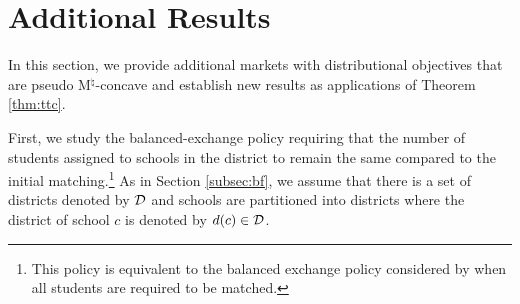 \documentclass[12pt]{amsart}
\theoremstyle{remark}
\newcommand{\ieh}[1]{{\color{orange} IEH: #1 }}
\newcommand{\fk}[1]{{\color{red} FK: #1 }}
\newcommand{\mby}[1]{{\color{blue} MBY: #1 }}
\begin{document}
\section{Additional Results}\label{app:additional}

\begin{comment}
\fk{In the present setting, we allow for some kids to be unassigned at $\mu_0$. Then, is it still a natural definition to say that ``export=import'' is the same thing as ``the same number of kids are matched in $\mu$ as in $\mu_0$''? For example, suppose that $\mu_0$ is the empty matching. In $\mu$, a kid living in  district $d$ is matched to a school in district $d'$, and a kid living in district $d'$ is matched to a school in district $d$. Then it seems that it's fair to say ``export=import'' but the number of matched kids at each district are different between $\mu_0$ and $\mu$.} \mby{Good point, shall we discuss what to do? We could change the name or study the alternative policy.} \ieh{Yes, it is a good point. This policy still reduces to the ``balanced exchange'' property of \cite{hafalir2022interdistrict}, but only in the case where all students are assigned under $\mu_0$. We may still keep the policy name the same, but change the description: ``Each school district would like to have the number of students assigned to schools in the district to remain the same compared to the initial matching.'' Currently, we are not keeping track of which student from which district is assigned to a school, all we note are their types. We would need to go beyond the current model if we would like to take ``exchanges'' more seriously. I am not saying it cannot be done, but it may overcomplicate the material. Let's discuss this on Tuesday.}
\end{comment}

In this section, we provide additional markets with distributional objectives that are pseudo M$^{\natural}$-concave and establish
new results as applications of Theorem \ref{thm:ttc}.

First, we study the balanced-exchange policy requiring that the number of students assigned to schools in the district to remain the same compared to the initial matching.\footnote{This policy is equivalent to the balanced exchange policy considered by \cite{hafalir2022interdistrict} when all students are required to be matched.} As in Section \ref{subsec:bf}, we assume that there is a set of districts denoted by $\mathcal{D}$ and
schools are partitioned into districts where the district of school $c$ is denoted by $d(c) \in \mathcal{D}$.
\end{document}

